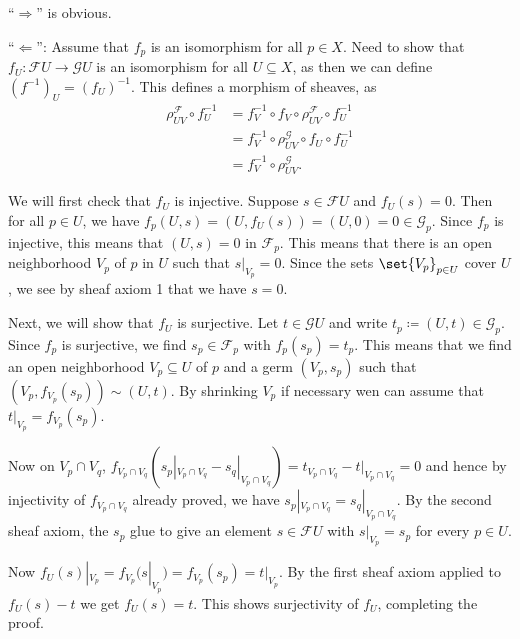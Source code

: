 \enquote{$\Longrightarrow$} is obvious.

\enquote{$\Longleftarrow$}: Assume that $f_p$ is an isomorphism for all
$p \in X$. Need to show that $f_U\colon \mathcal{F}U \to \mathcal{G}U$ is an
isomorphism for all $U \subseteq X$, as then we can define $(f^{-1})_U = (f_U)^{-1}$.
This defines a morphism of sheaves, as
\begin{align*}
	\rho_{UV}^{\mathcal{F}}\circ f_U^{-1} &= f_V^{-1}\circ f_V \circ \rho_{UV}^{\mathcal{F}} \circ f_U^{-1}\\
	&= f_V^{-1} \circ \rho_{UV}^{\mathcal{G}}\circ f_U \circ f_U^{-1}\\
	&= f_V^{-1} \circ \rho_{UV}^{\mathcal{G}}.
\end{align*}

We will first check that $f_U$ is injective. Suppose $s \in \mathcal{F}U$ and
$f_U(s) = 0$. Then for all $p \in U$, we have $f_p(U, s) = (U, f_U(s)) = (U, 0) = 0 \in \mathcal{G}_p$.
Since $f_p$ is injective, this means that $(U, s) = 0$ in $\mathcal{F}_p$. This
means that there is an open neighborhood $V_p$ of $p$ in $U$ such that
$s|_{V_p} = 0$. Since the sets $\set{V_p}_{p \in U}$ cover $U$, we see by
sheaf axiom 1 that we have $s = 0$.

Next, we will show that $f_U$ is surjective. Let $t \in \mathcal{G}U$ and write
$t_p\coloneqq (U, t) \in \mathcal{G}_p$. Since $f_p$ is surjective, we find $s_p \in \mathcal{F}_p$
with $f_p(s_p) = t_p$. This means that we find an open neighborhood $V_p \subseteq U$ of $p$
and a germ $(V_p, s_p)$ such that $(V_p, f_{V_p}(s_p)) \sim (U, t)$. By
shrinking $V_p$ if necessary wen can assume that $t|_{V_p} = f_{V_p}(s_p)$.

Now on $V_p\cap V_q$, $f_{V_p\cap V_q}(s_p|_{V_p\cap V_q} - s_q|_{V_p\cap V_q}) = t_{V_p\cap V_q} - t|_{V_p\cap V_q} = 0$
and hence by injectivity of $f_{V_p\cap V_q}$ already proved, we have $s_p|_{V_p\cap V_q} = s_q|_{V_p\cap V_q}$.
By the second sheaf axiom, the $s_p$ glue to give an element $s \in \mathcal{F}U$ with
$s|_{V_p} = s_p$ for every $p \in U$.

Now $f_U(s)|_{V_p} = f_{V_p}(s|_{V_p}) = f_{V_p}(s_p) = t|_{V_p}$.
By the first sheaf axiom applied to $f_U(s) - t$ we get $f_U(s) = t$. This shows
surjectivity of $f_U$, completing the proof.
